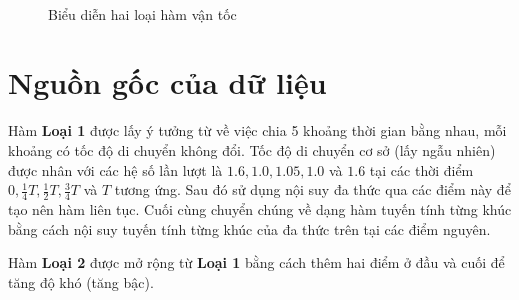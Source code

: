 \documentclass[../main.tex]{subfiles}
\begin{document}
\begin{figure}
  \centering

  \\


  \caption{Biểu diễn hai loại hàm vận tốc}
  \label{fig:11}
\end{figure}

\section{Nguồn gốc của dữ liệu}\label{nguux1ed3n-gux1ed1c-cux1ee7a-cuxe1c-huxe0m-thux1eddi-gian}

Hàm \textbf{Loại 1} được lấy ý tưởng từ \cite{figliozzi2012time} về
việc chia 5 khoảng thời gian bằng nhau, mỗi khoảng có tốc độ di chuyển
không đổi. Tốc độ di chuyển cơ sở (lấy ngẫu nhiên) được nhân với các hệ
số lần lượt là \(1.6, 1.0, 1.05, 1.0\) và \(1.6\) tại các thời điểm
\(0, \frac 1 4 T, \frac 1 2 T, \frac 3 4 T\) và \(T\) tương ứng. Sau đó sử dụng nội suy đa
thức qua các điểm này để tạo nên hàm liên tục. Cuối cùng chuyển chúng về
dạng hàm tuyến tính từng khúc bằng cách nội suy tuyến tính từng khúc của
đa thức trên tại các điểm nguyên.

Hàm \textbf{Loại 2} được mở rộng từ \textbf{Loại 1} bằng cách thêm hai
điểm ở đầu và cuối để tăng độ khó (tăng bậc).
\end{document}
